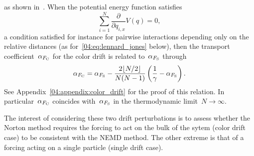 as shown in~\cite{R89}.
When the potential energy function satisfies
\begin{equation}
    \label{04:eq:pairwise_potential_type_condition}
    \sum_{i=1}^N \frac{\partial}{\partial q_{i,x}}V(q)=0,
\end{equation}
a condition satisfied for instance for pairwise interactions depending only on the relative distances (as for~\eqref{04:eq:lennard_jones} below), then the transport coefficient~$\alpha_{F_{\mathrm C}}$ for the color drift is related to~$\alpha_{F_{\mathrm S}}$ through
\begin{equation}
\label{04:eq:color_drift_relation}
    \alpha_{F_{\mathrm{C}}}=\alpha_{F_{\mathrm S}}-\frac{2\lfloor N/2 \rfloor}{N(N-1)}\left(\frac1{\gamma}-\alpha_{F_{\mathrm S}}\right).
\end{equation} 
See Appendix~\ref{04:appendix:color_drift} for the proof of this relation. In particular~$\alpha_{F_{\mathrm{C}}}$ coincides with~$\alpha_{F_{\mathrm{S}}}$ in the thermodynamic limit~$N\to\infty$.

The interest of considering these two drift perturbations is to assess whether the Norton method requires the forcing to act on the bulk of the sytem (color drift case) to be consistent with the NEMD method. The other extreme is that of a forcing acting on a single particle (single drift case).

